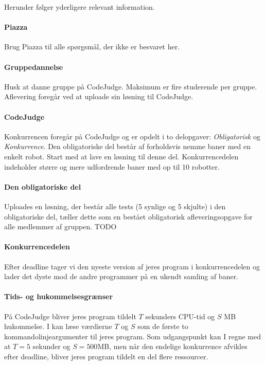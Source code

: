 \documentclass[10pt, a4paper]{article}
\begin{document}
Herunder følger yderligere relevant information.

\paragraph{Piazza} Brug Piazza til alle spørgsmål, der ikke er besvaret her.

\paragraph{Gruppedannelse} Husk at danne gruppe på CodeJudge.
Maksimum er fire studerende per gruppe.
Aflevering foregår ved at uploade sin løsning til CodeJudge.

\paragraph{CodeJudge} Konkurrencen foregår på CodeJudge og er opdelt i to delopgaver: \emph{Obligatorisk} og \emph{Konkurrence}.
Den obligatoriske del består af forholdsvis nemme baner med en enkelt robot.
Start med at lave en løsning til denne del.
Konkurrencedelen indeholder større og mere udfordrende baner med op til 10 robotter.

\paragraph{Den obligatoriske del} Uploades en løsning, der består alle tests (5 synlige og 5 skjulte) i den obligatoriske del, tæller dette som en bestået obligatorisk afleveringsopgave for alle medlemmer af gruppen. TODO

\paragraph{Konkurrencedelen} Efter deadline tager vi den nyeste version af jeres program i konkurrencedelen og lader det dyste mod de andre programmer på en ukendt samling af baner.

\paragraph{Tids- og hukommelsesgrænser} På CodeJudge bliver jeres program tildelt $T$ sekunders CPU-tid og $S$ MB hukommelse. I kan læse værdierne $T$ og $S$ som de første to kommandolinjeargumenter til jeres program. Som udgangspunkt kan I regne med at $T=5$ sekunder og $S=500$MB, men når den endelige konkurrence afvikles efter deadline, bliver jeres program tildelt en del flere ressourcer.
\end{document}
